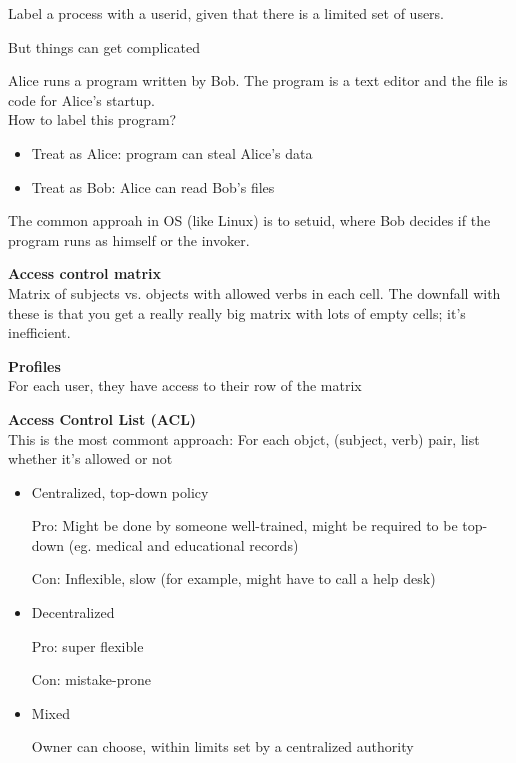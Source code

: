 \begin{example}
Label a process with a userid, given that there is a limited set of users.
\end{example}

But things can get complicated
\begin{example}
Alice runs a program written by Bob. The program is a text editor and the file is code for Alice's startup.\\

How to label this program?
\begin{itemize}
    \item Treat as Alice: program can steal Alice's data
    \item Treat as Bob: Alice can read Bob's files
\end{itemize}

The common approah in OS (like Linux) is to setuid, where Bob decides if the program runs as himself or the invoker.
\end{example}

\textbf{Access control matrix}\\
Matrix of subjects vs. objects with allowed verbs in each cell. The downfall with these is that you get a really really big matrix with lots of empty cells; it's inefficient. 

\textbf{Profiles}\\
For each user, they have access to their row of the matrix

\textbf{Access Control List (ACL)}\\
This is the most commont approach: For each objct, (subject, verb) pair, list whether it's allowed or not

\begin{itemize}
    \item Centralized, top-down policy

        Pro: Might be done by someone well-trained, might be required to be top-down (eg. medical and educational records)

        Con: Inflexible, slow (for example, might have to call a help desk)
    \item Decentralized

        Pro: super flexible

        Con: mistake-prone
    \item Mixed

        Owner can choose, within limits set by a centralized authority
\end{itemize}


